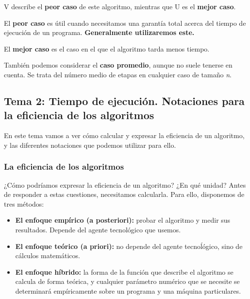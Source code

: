 \documentclass[11pt,a4paper]{article}
\begin{document}
\medskip

V describe el \textbf{peor caso} de este algoritmo, mientras que U es el \textbf{mejor caso}. 

\medskip

El \textbf{peor caso} es útil cuando necesitamos una garantía total acerca del tiempo de ejecución de un programa. \textbf{Generalmente utilizaremos este.}

\medskip

El \textbf{mejor caso} es el caso en el que el algoritmo tarda menos tiempo.

\medskip

También podemos considerar el \textbf{caso promedio}, aunque no suele tenerse en cuenta. Se trata del número medio de etapas en cualquier caso de tamaño \textit{n}.

\newpage

\subsection{Tema 2: Tiempo de ejecución. Notaciones para la eficiencia de los algoritmos}

En este tema vamos a ver cómo calcular y expresar la eficiencia de un algoritmo, y las diferentes notaciones que podemos utilizar para ello. 

\subsubsection{La eficiencia de los algoritmos}

¿Cómo podríamos expresar la eficiencia de un algoritmo? ¿En qué unidad? Antes de responder a estas cuestiones, necesitamos calcularla. Para ello, disponemos de tres métodos:

\begin{itemize}
\item \textbf{El enfoque empírico (a posteriori):} probar el algoritmo y medir sus resultados. Depende del agente tecnológico que usemos.

\item \textbf{El enfoque teórico (a priori):} no depende del agente tecnoĺógico, sino de cálculos matemáticos.

\item \textbf{El enfoque híbrido: } la forma de la función que describe el algoritmo se calcula de forma teórica, y cualquier parámetro numérico que se necesite se determinará empíricamente sobre un programa y una máquina particulares.
 
\end{itemize}
\end{document}
